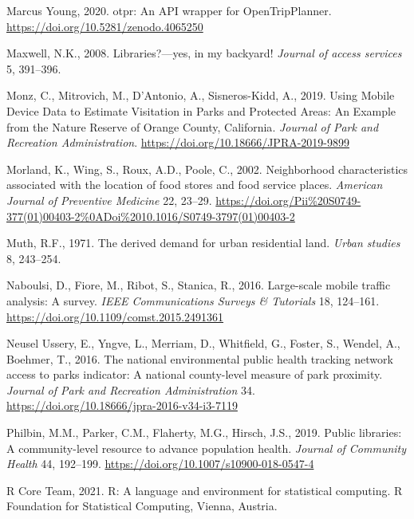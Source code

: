 \documentclass[3p, authoryear, review]{elsarticle} %
\newlength{\cslhangindent}
\newenvironment{CSLReferences}[2] %
 {%
  \setlength{\parindent}{0pt}
  \ifodd #1 \everypar{\setlength{\hangindent}{\cslhangindent}}\ignorespaces\fi
  \ifnum #2 > 0
  \setlength{\parskip}{#2\baselineskip}
  \fi
 }%
 {}
\begin{document}
\begin{CSLReferences}{1}{0}
\leavevmode{}%
Marcus Young, 2020. {otpr: An API wrapper for OpenTripPlanner}. \url{https://doi.org/10.5281/zenodo.4065250}

\leavevmode{}%
Maxwell, N.K., 2008. Libraries?---yes, in my backyard! \emph{Journal of access services} 5, 391--396.

\leavevmode{}%
Monz, C., Mitrovich, M., D'Antonio, A., Sisneros-Kidd, A., 2019. {Using Mobile Device Data to Estimate Visitation in Parks and Protected Areas: An Example from the Nature Reserve of Orange County, California}. \emph{Journal of Park and Recreation Administration}. \url{https://doi.org/10.18666/JPRA-2019-9899}

\leavevmode{}%
Morland, K., Wing, S., Roux, A.D., Poole, C., 2002. Neighborhood characteristics associated with the location of food stores and food service places. \emph{American Journal of Preventive Medicine} 22, 23--29. \url{https://doi.org/Pii\%20S0749-377(01)00403-2\%0ADoi\%2010.1016/S0749-3797(01)00403-2}

\leavevmode{}%
Muth, R.F., 1971. The derived demand for urban residential land. \emph{Urban studies} 8, 243--254.

\leavevmode{}%
Naboulsi, D., Fiore, M., Ribot, S., Stanica, R., 2016. Large-scale mobile traffic analysis: A survey. \emph{IEEE Communications Surveys \& Tutorials} 18, 124--161. \url{https://doi.org/10.1109/comst.2015.2491361}

\leavevmode{}%
Neusel Ussery, E., Yngve, L., Merriam, D., Whitfield, G., Foster, S., Wendel, A., Boehmer, T., 2016. The national environmental public health tracking network access to parks indicator: A national county-level measure of park proximity. \emph{Journal of Park and Recreation Administration} 34. \url{https://doi.org/10.18666/jpra-2016-v34-i3-7119}

\leavevmode{}%
Philbin, M.M., Parker, C.M., Flaherty, M.G., Hirsch, J.S., 2019. Public libraries: A community-level resource to advance population health. \emph{Journal of Community Health} 44, 192--199. \url{https://doi.org/10.1007/s10900-018-0547-4}

\leavevmode{}%
R Core Team, 2021. R: A language and environment for statistical computing. R Foundation for Statistical Computing, Vienna, Austria.


\end{CSLReferences}
\end{document}
